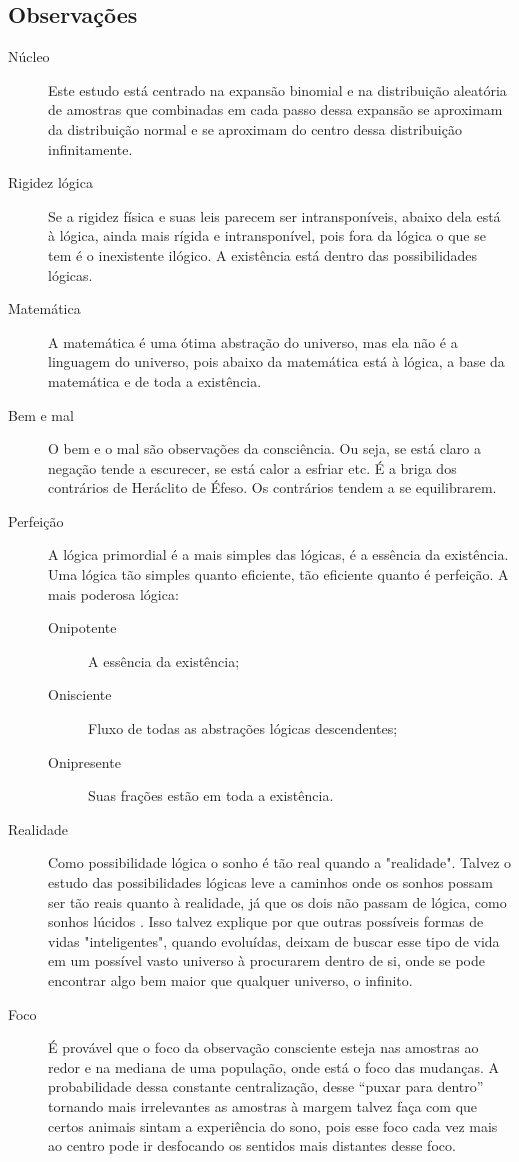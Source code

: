 \subsection{Observações}

\begin{description}
   \item[Núcleo] Este estudo está centrado na expansão binomial e na distribuição aleatória de amostras que combinadas em cada passo dessa expansão se aproximam da distribuição normal e se aproximam do centro dessa distribuição infinitamente.
   \item[Rigidez lógica] Se a rigidez física e suas leis parecem ser intransponíveis, abaixo dela está à lógica, ainda mais rígida e intransponível, pois fora da lógica o que se tem é o inexistente ilógico. A existência está dentro das possibilidades lógicas. 
   \item[Matemática] A matemática é uma ótima abstração do universo, mas ela não é a linguagem do universo, pois abaixo da matemática está à lógica, a base da matemática e de toda a existência.
   \item[Bem e mal] O bem e o mal são observações da consciência. Ou seja, se está claro a negação tende a escurecer, se está calor a esfriar etc. É a briga dos contrários de Heráclito de Éfeso. Os contrários tendem a se equilibrarem.
   \item[Perfeição] A lógica primordial é a mais simples das lógicas, é a essência da existência. Uma lógica tão simples quanto eficiente, tão eficiente quanto é perfeição. A mais poderosa lógica:
   \begin{description}
	   \item[Onipotente] A essência da existência;
	   \item[Onisciente] Fluxo de todas as abstrações lógicas descendentes; 
	   \item[Onipresente] Suas frações estão em toda a existência.
   \end{description}
   \item[Realidade] Como possibilidade lógica o sonho é tão real quando a "realidade". Talvez o estudo das possibilidades lógicas leve a caminhos onde os sonhos possam ser tão reais quanto à realidade, já que os dois não passam de lógica, como sonhos lúcidos \cite{ administradores_principio_pareto}. Isso talvez explique por que outras possíveis formas de vidas "inteligentes", quando evoluídas, deixam de buscar esse tipo de vida em um possível vasto universo à procurarem dentro de si, onde se pode encontrar algo bem maior que qualquer universo, o infinito.
   \item[Foco] É provável que o foco da observação consciente esteja nas amostras ao redor e na mediana de uma população, onde está o foco das mudanças. A probabilidade dessa constante centralização, desse “puxar para dentro” tornando mais irrelevantes as amostras à margem talvez faça com que certos animais sintam a experiência do sono, pois esse foco cada vez mais ao centro pode ir desfocando os sentidos mais distantes desse foco.
\end{description}